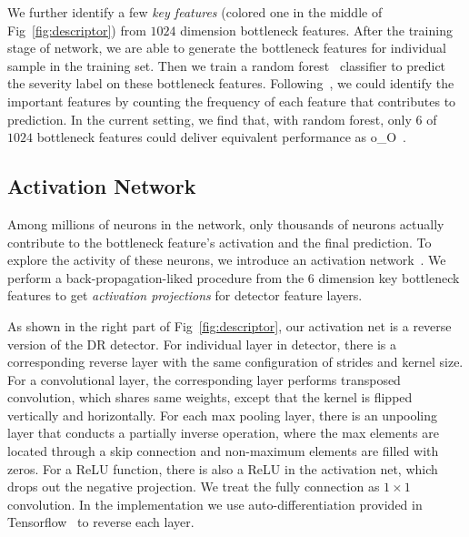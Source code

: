 \documentclass[letterpaper]{article} %
\begin{document}
   We further identify a few \emph{key features} (colored one in the middle of Fig~\ref{fig:descriptor}) from $1024$ dimension bottleneck features.  After the training stage of network, we are able to generate the bottleneck features for individual sample in the training set. Then we train a random forest~\cite{Dollar15PAMI} classifier to predict the severity label on these bottleneck features. Following~\cite{Gu17MICCAI}, we could identify the important features by counting the frequency of each feature that contributes to prediction. In the current setting, we find that, with random forest, only $6$  of  $1024$ bottleneck  features could deliver equivalent performance as o\_O~\cite{oO2016detector}.




	\subsection{Activation Network}

    Among millions of neurons in the network, only thousands of neurons actually contribute to the bottleneck feature's activation and the final prediction. To explore the activity of these neurons, we introduce an activation network~\cite{zeiler2014visualizing}. We perform a back-propagation-liked procedure from the $6$ dimension key bottleneck features to get \emph{activation projections} for detector feature layers.

    As shown in the right part of Fig~\ref{fig:descriptor}, our activation net is a reverse version of the DR detector. For individual layer in detector, there is a corresponding reverse layer with the same configuration of strides and kernel size. For a convolutional layer, the corresponding layer performs transposed convolution, which shares same weights, except that the kernel is flipped vertically and horizontally. For each max pooling layer, there is an unpooling layer that conducts a partially inverse operation, where the max elements are located through a skip connection and non-maximum elements are filled with zeros. For a ReLU function, there is also a ReLU in the activation net, which drops out the negative projection. We treat the fully connection as $1\times 1$ convolution. In the implementation we use auto-differentiation provided in Tensorflow~\cite{abadi2016tensorflow} to reverse each layer. %
\end{document}
